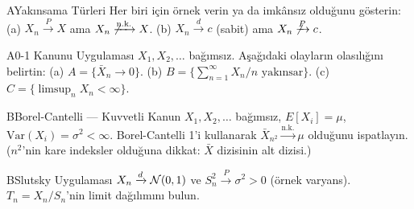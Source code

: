 
\alistirmalar

\begin{alistirma}[Al.7.5]{A}{Yakınsama Türleri}
Her biri için örnek verin ya da imkânsız olduğunu gösterin:
(a) $X_n \xrightarrow{P} X$ ama $X_n \not\xrightarrow{\text{n.k.}} X$.
(b) $X_n \xrightarrow{d} c$ (sabit) ama $X_n \not\xrightarrow{P} c$.
\end{alistirma}

\begin{alistirma}[Al.7.6]{A}{0-1 Kanunu Uygulaması}
$X_1, X_2, \ldots$ bağımsız. Aşağıdaki olayların olasılığını belirtin:
(a) $A = \{\bar{X}_n \to 0\}$.
(b) $B = \{\sum_{n=1}^\infty X_n/n \text{ yakınsar}\}$.
(c) $C = \{\limsup_n X_n < \infty\}$.
\end{alistirma}

\begin{alistirma}[Al.7.7]{B}{Borel-Cantelli --- Kuvvetli Kanun}
$X_1, X_2, \ldots$ bağımsız, $E[X_i] = \mu$, $\mathrm{Var}(X_i) = \sigma^2 < \infty$.
Borel-Cantelli 1'i kullanarak $\bar{X}_{n^2} \xrightarrow{\text{n.k.}} \mu$ olduğunu ispatlayın.
($n^2$'nin kare indeksler olduğuna dikkat: $\bar{X}$ dizisinin alt dizisi.)
\end{alistirma}

\begin{alistirma}[Al.7.8]{B}{Slutsky Uygulaması}
$X_n \xrightarrow{d} \mathcal{N}(0,1)$ ve $S_n^2 \xrightarrow{P} \sigma^2 > 0$ (örnek varyans).
$T_n = X_n / S_n$'nin limit dağılımını bulun.
\end{alistirma}

